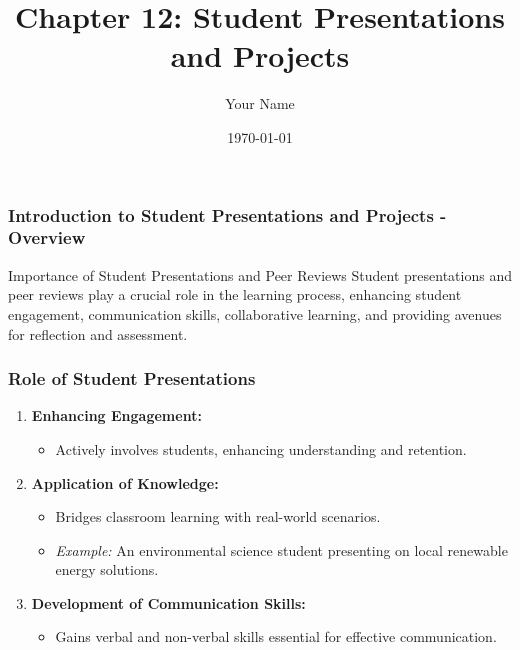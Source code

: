 \documentclass{beamer}
\title{Chapter 12: Student Presentations and Projects}
\author{Your Name}
\institute{Your Institution}
\date{\today}
\begin{document}
\frame{\titlepage}

\begin{frame}[fragile]
    \frametitle{Introduction to Student Presentations and Projects - Overview}
    \begin{block}{Importance of Student Presentations and Peer Reviews}
        Student presentations and peer reviews play a crucial role in the learning process, enhancing student engagement, communication skills, collaborative learning, and providing avenues for reflection and assessment.
    \end{block}
\end{frame}

\begin{frame}[fragile]
    \frametitle{Role of Student Presentations}
    \begin{enumerate}
        \item \textbf{Enhancing Engagement:}
        \begin{itemize}
            \item Actively involves students, enhancing understanding and retention.
        \end{itemize}
        
        \item \textbf{Application of Knowledge:}
        \begin{itemize}
            \item Bridges classroom learning with real-world scenarios.
            \item \textit{Example:} An environmental science student presenting on local renewable energy solutions.
        \end{itemize}
        
        \item \textbf{Development of Communication Skills:}
        \begin{itemize}
            \item Gains verbal and non-verbal skills essential for effective communication.
        \end{itemize}
    \end{enumerate}
\end{frame}
\end{document}
